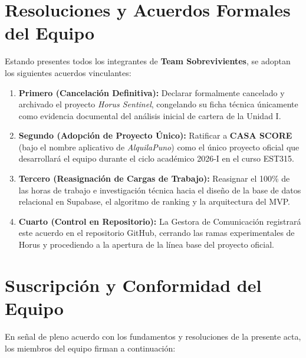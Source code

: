 \documentclass[11pt,a4paper]{article}
\begin{document}
\section{Resoluciones y Acuerdos Formales del Equipo}
Estando presentes todos los integrantes de \textbf{Team Sobrevivientes}, se adoptan los siguientes acuerdos vinculantes:

\begin{enumerate}[leftmargin=*]
    \item \textbf{Primero (Cancelación Definitiva):} Declarar formalmente cancelado y archivado el proyecto \textit{Horus Sentinel}, congelando su ficha técnica únicamente como evidencia documental del análisis inicial de cartera de la Unidad I.
    \item \textbf{Segundo (Adopción de Proyecto Único):} Ratificar a \textbf{CASA SCORE} (bajo el nombre aplicativo de \textit{AlquilaPuno}) como el único proyecto oficial que desarrollará el equipo durante el ciclo académico 2026-I en el curso EST315.
    \item \textbf{Tercero (Reasignación de Cargas de Trabajo):} Reasignar el 100\% de las horas de trabajo e investigación técnica hacia el diseño de la base de datos relacional en Supabase, el algoritmo de ranking y la arquitectura del MVP.
    \item \textbf{Cuarto (Control en Repositorio):} La Gestora de Comunicación registrará este acuerdo en el repositorio GitHub, cerrando las ramas experimentales de Horus y procediendo a la apertura de la línea base del proyecto oficial.
\end{enumerate}

\vspace{0.4cm}

\section{Suscripción y Conformidad del Equipo}
\noindent En señal de pleno acuerdo con los fundamentos y resoluciones de la presente acta, los miembros del equipo firman a continuación:

\vspace{1.8cm}
\end{document}
